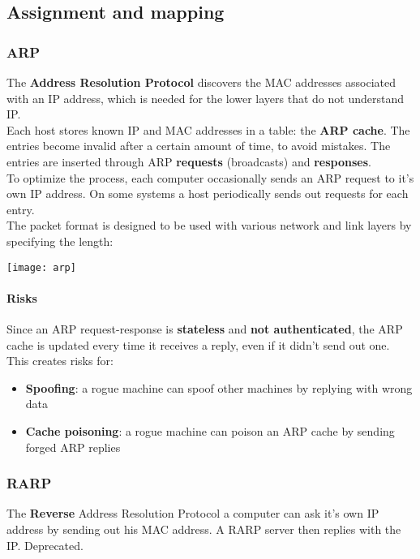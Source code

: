 \newpage
\subsection{Assignment and mapping}
\subsubsection{ARP}
The \textbf{Address Resolution Protocol} discovers the MAC addresses associated with an IP address, which is needed for the lower layers that do not understand IP.\\
Each host stores known IP and MAC addresses in a table: the \textbf{ARP cache}. The entries become invalid after a certain amount of time, to avoid mistakes. The entries are inserted through ARP \textbf{requests} (broadcasts) and \textbf{responses}. \\
To optimize the process, each computer occasionally sends an ARP request to it's own IP address. On some systems a host periodically sends out requests for each entry.\\
The packet format is designed to be used with various network and link layers by specifying the length:
\begin{center}
	\texttt{[image: arp]}
\end{center}

\paragraph{Risks} Since an ARP request-response is \textbf{stateless} and \textbf{not authenticated}, the ARP cache is updated every time it receives a reply, even if it didn't send out one. This creates risks for:
\begin{itemize}
	\item \textbf{Spoofing}: a rogue machine can spoof other machines by replying with wrong data
	\item \textbf{Cache poisoning}: a rogue machine can poison an ARP cache by sending forged ARP replies
\end{itemize}

\subsubsection{RARP}
The \textbf{Reverse} Address Resolution Protocol a computer can ask it's own IP address by sending out his MAC address. A RARP server then replies with the IP. Deprecated.

